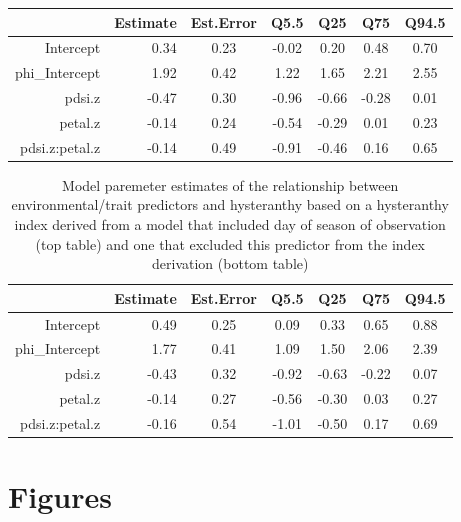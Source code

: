 \documentclass{article}[11pt]
\begin{document}
\begin{table}[ht]
\centering
\begin{tabular}{rrccccc}
  \hline
 & Estimate & Est.Error & Q5.5 & Q25 & Q75 & Q94.5 \\ 
  \hline
Intercept & 0.34 & 0.23 & -0.02 & 0.20 & 0.48 & 0.70 \\ 
  phi\_Intercept & 1.92 & 0.42 & 1.22 & 1.65 & 2.21 & 2.55 \\ 
  pdsi.z & -0.47 & 0.30 & -0.96 & -0.66 & -0.28 & 0.01 \\ 
  petal.z & -0.14 & 0.24 & -0.54 & -0.29 & 0.01 & 0.23 \\ 
  pdsi.z:petal.z & -0.14 & 0.49 & -0.91 & -0.46 & 0.16 & 0.65 \\ 
   \hline
\end{tabular}
\end{table}
\begin{table}
\centering
\begin{tabular}{rrccccc}
  \hline
 & Estimate & Est.Error & Q5.5 & Q25 & Q75 & Q94.5 \\ 
  \hline
Intercept & 0.49 & 0.25 & 0.09 & 0.33 & 0.65 & 0.88 \\ 
  phi\_Intercept & 1.77 & 0.41 & 1.09 & 1.50 & 2.06 & 2.39 \\ 
  pdsi.z & -0.43 & 0.32 & -0.92 & -0.63 & -0.22 & 0.07 \\ 
  petal.z & -0.14 & 0.27 & -0.56 & -0.30 & 0.03 & 0.27 \\ 
  pdsi.z:petal.z & -0.16 & 0.54 & -1.01 & -0.50 & 0.17 & 0.69 \\ 
   \hline
\end{tabular}
\caption{Model paremeter estimates of the relationship between environmental/trait predictors and hysteranthy based on a hysteranthy index derived from a model that included day of season of observation (top table) and one that excluded this predictor from the index derivation (bottom table)}
\label{tab:nodoy}
\end{table}

\pagebreak[4]

\section*{Figures} 
\end{document}
